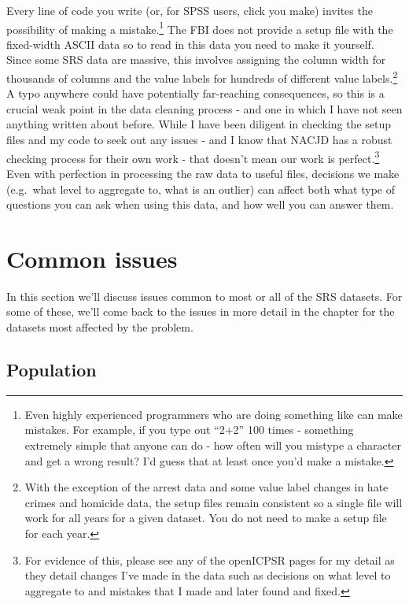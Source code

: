 \documentclass[
  12pt,
  openany]{book}
\begin{document}
Every line of code you write (or, for SPSS users, click you make) invites the possibility of making a mistake.\footnote{Even highly experienced programmers who are doing something like can make mistakes. For example, if you type out ``2+2'' 100 times - something extremely simple that anyone can do - how often will you mistype a character and get a wrong result? I'd guess that at least once you'd make a mistake.} The FBI does not provide a setup file with the fixed-width ASCII data so to read in this data you need to make it yourself. Since some SRS data are massive, this involves assigning the column width for thousands of columns and the value labels for hundreds of different value labels.\footnote{With the exception of the arrest data and some value label changes in hate crimes and homicide data, the setup files remain consistent so a single file will work for all years for a given dataset. You do not need to make a setup file for each year.} A typo anywhere could have potentially far-reaching consequences, so this is a crucial weak point in the data cleaning process - and one in which I have not seen anything written about before. While I have been diligent in checking the setup files and my code to seek out any issues - and I know that NACJD has a robust checking process for their own work - that doesn't mean our work is perfect.\footnote{For evidence of this, please see any of the openICPSR pages for my detail as they detail changes I've made in the data such as decisions on what level to aggregate to and mistakes that I made and later found and fixed.} Even with perfection in processing the raw data to useful files, decisions we make (e.g.~what level to aggregate to, what is an outlier) can affect both what type of questions you can ask when using this data, and how well you can answer them.

\section{Common issues}\label{common-issues}

In this section we'll discuss issues common to most or all of the SRS datasets. For some of these, we'll come back to the issues in more detail in the chapter for the datasets most affected by the problem.

\subsection{Population}\label{population}
\end{document}
